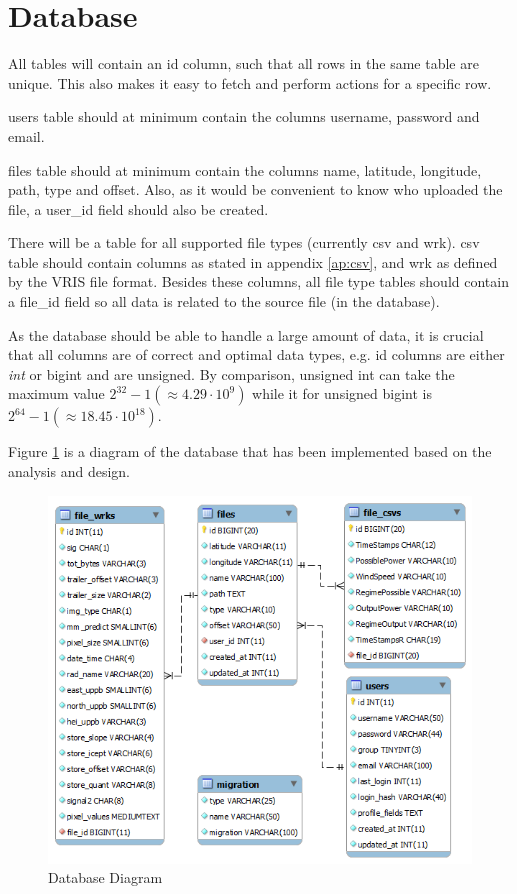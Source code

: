 \section{Database}
\label{sec:database}
All tables will contain an \textsf{id} column, such that all rows in the same table are unique. This also makes it easy to fetch and perform actions for a specific row.

\textsf{users} table should at minimum contain the columns \textsf{username, password} and \textsf{email}.

\textsf{files} table should at minimum contain the columns \textsf{name, latitude, longitude, path, type} and \textsf{offset}.
Also, as it would be convenient to know who uploaded the file, a \textsf{user\_id} field should also be created.

There will be a table for all supported file types (currently \textsf{csv} and \textsf{wrk}). \textsf{csv} table should contain columns as stated in appendix \ref{ap:csv}, and \textsf{wrk} as defined by the VRIS file format. Besides these columns, all file type tables should contain a \textsf{file\_id} field so all data is related to the source file (in the database).

As the database should be able to handle a large amount of data, it is crucial that all columns are of correct and optimal data types, e.g. \textsf{id} columns are either \textit{int} or \textsf{bigint} and are \textsf{unsigned}. By comparison, \textsf{unsigned int} can take the maximum value $2^{32}-1 (\approx 4.29 \cdot 10^{9})$ while it for \textsf{unsigned bigint} is $ 2^{64}-1 (\approx 18.45 \cdot 10^{18})$.

Figure \ref{fig:dbdiagram} is a diagram of the database that has been implemented based on the analysis and design.

\begin{figure}[htbp]
   \centering
   \includegraphics[width=1\linewidth]{figure/db}
   \caption{Database Diagram}
   \label{fig:dbdiagram}
\end{figure}

